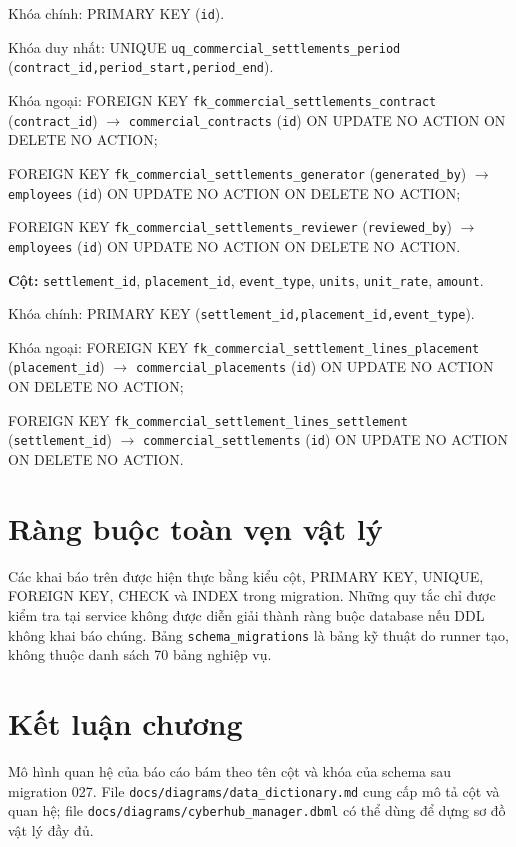 \begin{description}[leftmargin=3.6cm,labelwidth=3.4cm,style=nextline]
Khóa chính: PRIMARY KEY (\texttt{id}).

Khóa duy nhất: UNIQUE \texttt{uq\_commercial\_settlements\_period} (\texttt{contract\_id,period\_start,period\_end}).

Khóa ngoại: FOREIGN KEY \texttt{fk\_commercial\_settlements\_contract} (\texttt{contract\_id}) $\rightarrow$ \texttt{commercial\_contracts} (\texttt{id}) ON UPDATE NO ACTION ON DELETE NO ACTION;\par FOREIGN KEY \texttt{fk\_commercial\_settlements\_generator} (\texttt{generated\_by}) $\rightarrow$ \texttt{employees} (\texttt{id}) ON UPDATE NO ACTION ON DELETE NO ACTION;\par FOREIGN KEY \texttt{fk\_commercial\_settlements\_reviewer} (\texttt{reviewed\_by}) $\rightarrow$ \texttt{employees} (\texttt{id}) ON UPDATE NO ACTION ON DELETE NO ACTION.

\item[\texttt{commercial\_settlement\_lines}] \textbf{Cột:} \texttt{settlement\_id}, \texttt{placement\_id}, \texttt{event\_type}, \texttt{units}, \texttt{unit\_rate}, \texttt{amount}.

Khóa chính: PRIMARY KEY (\texttt{settlement\_id,placement\_id,event\_type}).

Khóa ngoại: FOREIGN KEY \texttt{fk\_commercial\_settlement\_lines\_placement} (\texttt{placement\_id}) $\rightarrow$ \texttt{commercial\_placements} (\texttt{id}) ON UPDATE NO ACTION ON DELETE NO ACTION;\par FOREIGN KEY \texttt{fk\_commercial\_settlement\_lines\_settlement} (\texttt{settlement\_id}) $\rightarrow$ \texttt{commercial\_settlements} (\texttt{id}) ON UPDATE NO ACTION ON DELETE NO ACTION.

\end{description}

\section{Ràng buộc toàn vẹn vật lý}

Các khai báo trên được hiện thực bằng kiểu cột, PRIMARY KEY, UNIQUE, FOREIGN KEY, CHECK và INDEX trong migration. Những quy tắc chỉ được kiểm tra tại service không được diễn giải thành ràng buộc database nếu DDL không khai báo chúng. Bảng \texttt{schema\_migrations} là bảng kỹ thuật do runner tạo, không thuộc danh sách 70 bảng nghiệp vụ.

\section{Kết luận chương}

Mô hình quan hệ của báo cáo bám theo tên cột và khóa của schema sau migration 027. File \texttt{docs/diagrams/data\_dictionary.md} cung cấp mô tả cột và quan hệ; file \texttt{docs/diagrams/cyberhub\_manager.dbml} có thể dùng để dựng sơ đồ vật lý đầy đủ.
